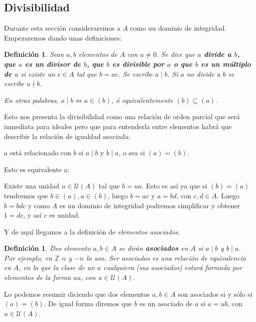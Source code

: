 \documentclass[12pt]{article}
\newtheorem{definition}[theorem]{Definición}
\begin{document}
\subsection{Divisibilidad}

Durante esta sección consideraremos a $A$ como un dominio de integridad. Empezaremos dando unas definiciones:

\begin{definition} Sean $a, b$ elementos de $A$ con $a \neq 0$. Se dice que \textbf{$a$ divide a $b$, que $a$ es un divisor de $b$, que $b$ es divisible por $a$ o que $b$ es un múltiplo de $a$} si existe un $c \in A$ tal que $b = ac$. Se escribe $a \mid b$. Si $a$ no divide a $b$ se escribe $a \nmid b$.

En otras palabras, $a \mid b \Leftrightarrow a \in (b)$, ó equivalentemente $(b) \subseteq (a)$.
\end{definition}

Esto nos presenta la divisibilidad como una relación de orden parcial que será inmediata para ideales pero que para entenderla entre elementos habrá que describir la relación de igualdad asociada: 

\begin{center}
$a$ está relacionado con $b$ si $a \mid b$ y $b \mid a$, o sea si $(a) = (b).$
\end{center} 

Esto es equivalente a: 

Existe una unidad $u \in \mathcal{U}(A)$ tal que $b = ua$. Esto es así ya que si $(b) = (a)$ tendremos que $b \in (a), a \in (b)$, luego $b = ac$ y $a = bd$, con $c, d \in A$. Luego $b = bdc$ y como $A$ es un dominio de integridad podremos simplificar y obtener $1 = dc$, y así $c$ es unidad.

Y de aquí llegamos a la definición de \textit{elementos asociados}.

\begin{definition}Dos elemento $a,b \in A$ se dirán \textbf{asociados} en $A$ si $a \mid b$ y $b \mid a$. Por ejemplo, en $\mathbb{Z}$ $n$ y $-n$ lo son. Ser asociados es una relación de equivalencia en $A$, en la que la clase de un $a$ cualquiera (sus asociados) estará formada por elementos de la forma $ua$, con $u \in \mathcal{U}(A)$. 
\end{definition}

Lo podemos resumir diciendo que dos elementos $a,b \in A$ son asociados si y sólo si $(a) = (b)$. De igual forma diremos que $b$ es un asociado de $a$ si $a = ub$, con $u \in \mathcal{U}(A)$.
\end{document}
